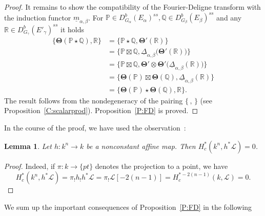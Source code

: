 \documentclass[a4paper,10pt]{amsart}
\def\a{\alpha}
\def\FD{\boldsymbol{\Theta}}
\newtheorem{lem}[theo]{Lemma}
\numberwithin{equation}{section}
\begin{document}
\begin{proof}
It remains to show the compatibility of the Fourier-Deligne transform with the induction functor $\underline{m}_{\a,\beta}$. For $\mathbb{P} \in D^b_{G_{\a}}(E_{\a})^{ss}, \mathbb{Q} \in D^b_{G_{\beta}}(E_{\beta})^{ss}$ and any $\mathbb{R} \in D^b_{G_{\gamma}}(E'_{\gamma})^{ss}$ it holds
\begin{equation*}
\begin{split}
\{ \FD (\mathbb{P} \star \mathbb{Q}), \mathbb{R}\} &= \{ \mathbb{P} \star \mathbb{Q}, \FD'(\mathbb{R})\}\\
&=\{ \mathbb{P} \boxtimes \mathbb{Q}, \underline{\Delta}_{\a,\beta}\big(\FD'(\mathbb{R})\big)\}\\
&=\{ \mathbb{P} \boxtimes \mathbb{Q}, \FD' \otimes \FD' \big(\underline{\Delta}_{\a,\beta}(\mathbb{R})\big)\}\\
&=\{ \FD(\mathbb{P}) \boxtimes \FD(\mathbb{Q}), \underline{\Delta}_{\a,\beta}(\mathbb{R})\}\\
&=\{ \FD(\mathbb{P}) \star \FD(\mathbb{Q}), \mathbb{R}\}.
\end{split}
\end{equation*}
The result follows from the nondegeneracy of the pairing $\{\,,\,\}$ (see Proposition~\ref{C:scalarprod}). Proposition~\ref{P:FD} is proved.
\end{proof}

\vspace{.1in}

In the course of the proof, we have used the observation~:

\begin{lem}\label{L:FDaffine} Let $h: {k}^n \to {k}$ be a nonconstant affine map. Then $H^*_c({k}^n,h^*\mathcal{L})=0$.
\end{lem}
\begin{proof} Indeed, if $\pi: {k} \to \{pt\}$ denotes the projection to a point, we have
$$H^*_c({k}^n,h^*\mathcal{L})=\pi_!h_! h^*\mathcal{L} =\pi_!\mathcal{L}[-2(n-1)]=H^{*-2(n-1)}_c({k},\mathcal{L})=0.$$
\end{proof}

We sum up the important consequences of Proposition~\ref{P:FD} in the following

\vspace{.1in}
\end{document}
